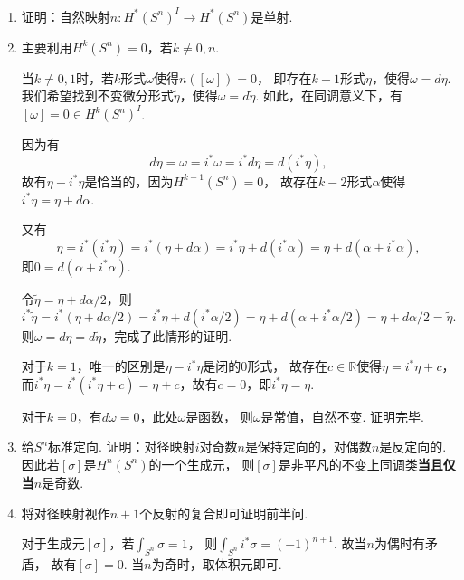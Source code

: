 \begin{itemize}
\begin{enumerate}
        \item[(b)] 证明：自然映射$n:H^{*}(S^{n})^{I} \to H^{*}(S^{n})$是单射.
        \item[\textbf{证明：}]
            \qquad 主要利用$H^k(S^n)=0$，若$k\neq 0,n$.\par
            \qquad 当$k\neq 0,1$时，若$k$形式$\omega$使得$n([\omega])=0$，
            即存在$k-1$形式$\eta$，使得$\omega=d\eta$. 
            我们希望找到不变微分形式$\tilde{\eta}$，使得$\omega=d\tilde{\eta}$. 
            如此，在同调意义下，有$[\omega]=0\in H^k(S^n)^I$.\par
            \qquad 因为有
                $$d\eta=\omega=i^*\omega=i^*d\eta=d(i^*\eta),$$
            故有$\eta-i^*\eta$是恰当的，因为$H^{k-1}(S^n)=0$，
            故存在$k-2$形式$\alpha$使得$i^*\eta=\eta+d\alpha$.\par
            \qquad 又有
                $$\eta=i^*(i^*\eta)=i^*(\eta+d\alpha)
                =i^*\eta+d(i^*\alpha)=\eta+d(\alpha+i^*\alpha),$$
            即$0=d(\alpha+i^*\alpha)$.\par
            \qquad 令$\tilde{\eta}=\eta+d\alpha/2$，则
                $$i^*\tilde{\eta}=i^*(\eta+d\alpha/2)
                =i^*\eta+d(i^*\alpha/2)=\eta+d(\alpha+i^*\alpha/2)
                =\eta+d\alpha/2=\tilde{\eta}.$$
            则$\omega=d\eta=d\tilde{\eta}$，完成了此情形的证明.\par
            \qquad 对于$k=1$，唯一的区别是$\eta-i^*\eta$是闭的$0$形式，
            故存在$c\in \mathbb{R}$使得$\eta=i^*\eta+c$，
            而$i^*\eta=i^*(i^*\eta+c)=\eta+c$，故有$c=0$，即$i^*\eta=\eta$.\par
            \qquad 对于$k=0$，有$d\omega=0$，此处$\omega$是函数，
            则$\omega$是常值，自然不变. 证明完毕.

        \item[(c)] 给$S^{n}$标准定向. 
                   证明：对径映射$i$对奇数$n$是保持定向的，对偶数$n$是反定向的.
                   因此若$[\sigma]$是$H^{n}(S^{n})$的一个生成元，
                   则$[\sigma]$是非平凡的不变上同调类\textbf{当且仅当}$n$是奇数.
        \item[\textbf{证明：}]
            \qquad 将对径映射视作$n+1$个反射的复合即可证明前半问.\par
            \qquad 对于生成元$[\sigma]$，若$\int_{S^n}\sigma=1$，
            则$\int_{S^n} i^*\sigma=(-1)^{n+1}$. 故当$n$为偶时有矛盾，
            故有$[\sigma]=0$. 当$n$为奇时，取体积元即可.


\end{enumerate}
\end{itemize}
